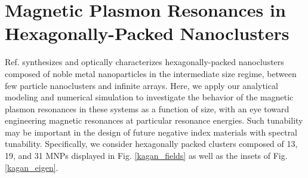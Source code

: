 \documentclass[journal=apchd5,manuscript=article]{achemso}
\begin{document}
\section{Magnetic Plasmon Resonances in Hexagonally-Packed Nanoclusters}
Ref. \cite{Engheta2017} synthesizes and optically characterizes hexagonally-packed nanoclusters composed of noble metal nanoparticles in the intermediate size regime, between few particle nanoclusters and infinite arrays. Here, we apply our analytical modeling and numerical simulation to investigate the behavior of the magnetic plasmon resonances in these systems as a function of size, with an eye toward engineering magnetic resonances at particular resonance energies. Such tunability may be important in the design of future negative index materials with spectral tunability. Specifically, we consider hexagonally packed clusters composed of 13, 19, and 31 MNPs displayed in Fig. \ref{kagan_fields} as well as the insets of Fig. \ref{kagan_eigen}.
\end{document}
